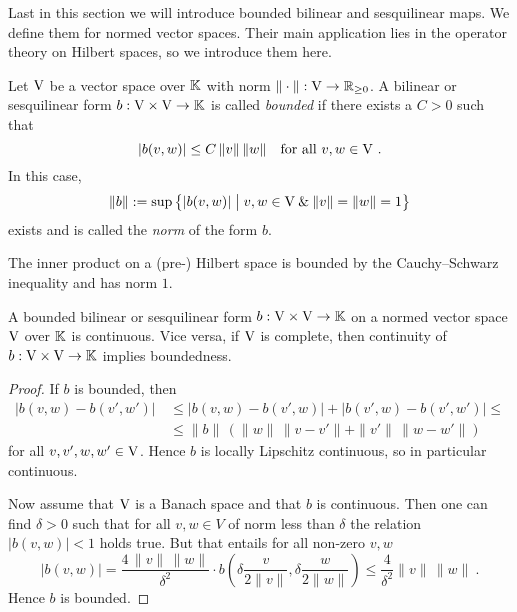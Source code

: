 \para
Last in this section we will introduce bounded bilinear and sesquilinear maps. We define them for normed
vector spaces. Their main application lies in the operator theory on Hilbert spaces, so we introduce
them here.  

\begin{definition}
  Let $\mathrm{V}$ be a vector space over $\mathbb{K}$ with norm $\| \cdot \| : \mathrm{V} \to \mathbb{R}_{\geq 0}$. 
  A bilinear or sesquilinear form $b : \mathrm{V} \times \mathrm{V} \to \mathbb{K}$ is called \emph{bounded} if 
  there exists a $C >0$ such that 
  \[
    | b(v,w)| \leq C \, \| v\| \, \| w \| \quad \text{for all } v,w \in \mathrm{V} \ .
  \]
  In this case,
  \[
    \| b \| := \sup \big\{ | b(v,w) | \bigm\vert v,w \in \mathrm{V} \: \& \: \| v\| = \| w \| = 1 \big\} 
  \] 
  exists and is called the \emph{norm} of the form $b$. 
\end{definition}
\begin{example}
  The inner product on a (pre-) Hilbert space is bounded by the Cauchy--Schwarz inequality and has norm $1$.
\end{example}

\begin{proposition}
A bounded bilinear or sesquilinear form $b : \mathrm{V} \times \mathrm{V} \to \mathbb{K}$ on a normed vector space $\mathrm{V}$ over 
$\mathbb{K}$ is continuous. Vice versa, if $\mathrm{V}$ is complete, then continuity of $b : \mathrm{V} \times \mathrm{V} \to \mathbb{K}$
implies boundedness.
 \end{proposition}
\begin{proof}
If $b$ is bounded, then
\begin{equation*}
  \begin{split} 
  \big\vert b(v,w) - b(v',w') \big\vert \, & 
  \leq   \big\vert b(v,w) - b(v',w) \big\vert + \big\vert b(v',w) - b(v',w') \big\vert \leq \\
  & \leq \| b \| \, \left( \|  w \| \, \| v-v'\| +  \|  v' \| \, \| w-w'\| \right)   
  \end{split}
\end{equation*}
for all $v,v',w,w' \in \mathrm{V}$. Hence $b$ is locally Lipschitz continuous, so in particular continuous. 

Now assume that $\mathrm{V}$ is a Banach space and that $b$ is continuous. Then one can find $\delta >0$ such that 
for all $v,w \in  V$ of norm less than $\delta$ the relation $ |b(v,w)| < 1$ holds true. But that entails for all 
non-zero $v,w$
\[
   |b(v,w)| = \frac{4 \, \|v\| \, \|w\|}{\delta^2} \cdot b\left( \delta \frac{v}{2 \|v\|}, \delta \frac{w}{2 \|w\|}\right)
   \leq  \frac{4}{ \delta^2} \|v\| \, \|w\| \ .
\] 
Hence $b$ is bounded.
\end{proof}



